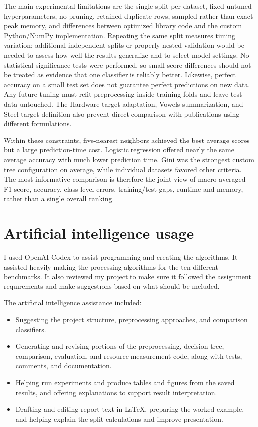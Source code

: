 \documentclass[11pt,letterpaper]{article}
\begin{document}
The main experimental limitations are the single split per dataset, fixed
untuned hyperparameters, no pruning, retained duplicate rows, sampled rather
than exact peak memory, and differences between optimized library code and the
custom Python/NumPy implementation. Repeating the same split measures timing
variation; additional independent splits or properly nested validation would be
needed to assess how well the results generalize and to select model settings.
No statistical significance tests were performed, so small score differences
should not be treated as evidence that one classifier is reliably better.
Likewise, perfect accuracy on a small test set does not guarantee perfect
predictions on new data. Any future tuning
must refit preprocessing inside training folds and leave test data untouched.
The Hardware target adaptation, Vowels summarization, and Steel target definition
also prevent direct comparison with publications using different formulations.

Within these constraints, five-nearest neighbors achieved the best average scores but a large
prediction-time cost. Logistic regression offered nearly the same average accuracy with much
lower prediction time. Gini was the strongest custom tree configuration on
average, while individual datasets favored other criteria. The most informative
comparison is therefore the joint view of macro-averaged F1 score, accuracy, class-level errors,
training/test gaps, runtime and memory, rather than a single overall ranking.

\section{Artificial intelligence usage}
I used OpenAI Codex to assist programming and creating the algorithms. 
It assisted heavily making the processing algorithms for the ten different
benchmarks. It also reviewed my project to make sure it followed the assignment
requirements and make suggestions based on what should be included. 

The artificial intelligence assistance included:
\begin{itemize}
\item Suggesting the project structure, preprocessing approaches, and comparison
classifiers.
\item Generating and revising portions of the preprocessing, decision-tree,
comparison, evaluation, and resource-measurement code, along with tests,
comments, and documentation.
\item Helping run experiments and produce tables and figures from the saved
results, and offering explanations to support result interpretation.
\item Drafting and editing report text in LaTeX, preparing the worked example,
and helping explain the split calculations and improve presentation.
\end{itemize}
\end{document}
